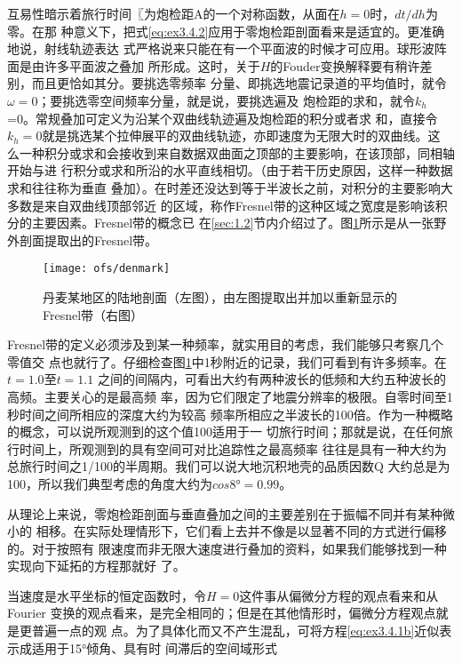 互易性暗示着旅行时间〖为炮检距A的一个对称函数，从面在$h=0$时，$dt/dh$为零。在那
种意义下，把式\ref{eq:ex3.4.2}应用于零炮检距剖面看来是适宜的。更准确地说，射线轨迹表达
式严格说来只能在有一个平面波的时候才可应用。球形波阵面是由许多平面波之叠加
所形成。这时，关于$H$的Fouder变换解释要有稍许差别，而且更恰如其分。要挑选零频率
分量、即挑选地震记录道的平均值时，就令$\omega=0$；要挑选零空间频率分量，就是说，要挑选遍及
炮检距的求和，就令$k_h$=0。常规叠加可定义为沿某个双曲线轨迹遍及炮检距的积分或者求
和，直接令$k_h=0$就是挑选某个拉伸展平的双曲线轨迹，亦即速度为无限大时的双曲线。这
么一种积分或求和会接收到来自数据双曲面之顶部的主要影响，在该顶部，同相轴开始与进
行积分或求和所沿的水平直线相切。（由于若干历史原因，这样一种数据求和往往称为垂直
叠加）。在时差还没达到等于半波长之前，对积分的主要影响大多数是来自双曲线顶部邻近
的区域，称作Fresnel带的这种区域之宽度是影响该积分的主要因素。Fresnel带的概念已
在\ref{sec:1.2}节内介绍过了。图\ref{fig:ofs/denmark}所示是从一张野外剖面提取出的Fresnel带。

\begin{figure}[H]
\centering
\texttt{[image: ofs/denmark]}
\caption[denmark]{丹麦某地区的陆地剖面（左图），由左图提取出并加以重新显示的
Fresnel带（右图）}
\label{fig:ofs/denmark}
\end{figure}

Fresnel带的定义必须涉及到某一种频率，就实用目的考虑，我们能够只考察几个零值交
点也就行了。仔细检查图\ref{fig:ofs/denmark}中1秒附近的记录，我们可看到有许多频率。在$t=1.0$至$t=1.1$
之间的间隔内，可看出大约有两种波长的低频和大约五种波长的高频。主要关心的是最高频
率，因为它们限定了地震分辨率的极限。自零时间至1秒时间之间所相应的深度大约为较高
频率所相应之半波长的100倍。作为一种概略的概念，可以说所观测到的这个值100适用于一
切旅行时间；那就是说，在任何旅行时间上，所观测到的具有空间可对比追踪性之最高频率
往往是具有一种大约为总旅行时间之1/100的半周期。我们可以说大地沉积地壳的品质因数Q
大约总是为100，所以我们典型考虑的角度大约为$cos8° = 0.99$。

从理论上来说，零炮检距剖面与垂直叠加之间的主要差别在于振幅不同并有某种微小的
相移。在实际处理情形下，它们看上去并不像是以显著不同的方式迸行偏移的。对于按照有
限速度而非无限大速度进行叠加的资料，如果我们能够找到一种实现向下延拓的方程那就好
了。

当速度是水平坐标的恒定函数时，令$H=0$这件事从偏微分方程的观点看来和从Fourier
变换的观点看来，是完全相同的；但是在其他情形时，偏微分方程观点就是更普遍一点的观
点。为了具体化而又不产生混乱，可将方程\ref{eq:ex3.4.1b}近似表示成适用于15°倾角、具有时
间滞后的空间域形式

